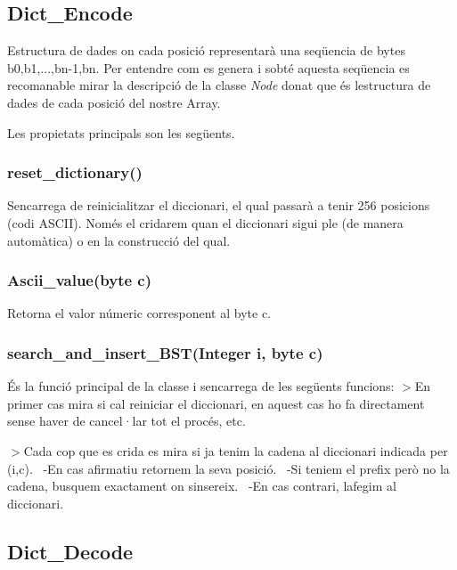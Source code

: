 \subsection*{Dict\+\_\+\+Encode}

Estructura de dades on cada posició representarà una seqüencia de bytes b0,b1,...,bn-\/1,bn. Per entendre com es genera i s\textquotesingle{}obté aquesta seqüencia es recomanable mirar la descripció de la classe {\itshape Node} donat que és l\textquotesingle{}estructura de dades de cada posició del nostre Array.

Les propietats principals son les següents.

\subsubsection*{reset\+\_\+dictionary()}

S\textquotesingle{}encarrega de reinicialitzar el diccionari, el qual passarà a tenir 256 posicions (codi A\+S\+C\+II). Només el cridarem quan el diccionari sigui ple (de manera automàtica) o en la construcció del qual.

\subsubsection*{Ascii\+\_\+value(byte c)}

Retorna el valor númeric corresponent al byte c.

\subsubsection*{search\+\_\+and\+\_\+insert\+\_\+\+B\+S\+T(\+Integer i, byte c)}

És la funció principal de la classe i s\textquotesingle{}encarrega de les següents funcions\+: $>$En primer cas mira si cal reiniciar el diccionari, en aquest cas ho fa directament sense haver de cancel·lar tot el procés, etc.

$>$Cada cop que es crida es mira si ja tenim la cadena al diccionari indicada per (i,c).~\newline
 -\/\+En cas afirmatiu retornem la seva posició.~\newline
 -\/\+Si teniem el prefix però no la cadena, busquem exactament on s\textquotesingle{}insereix.~\newline
 -\/\+En cas contrari, l\textquotesingle{}afegim al diccionari.

\subsection*{Dict\+\_\+\+Decode}

